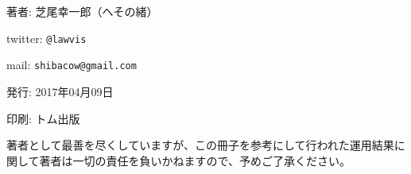 \documentclass[a5j,openany,twoside]{jsbook}
\begin{document}
\newpage

\begin{flushright}
\begin{minipage}{0.7\hsize}
\begin{description}[labelindent=1em ,labelwidth=0cm, labelsep*=1em, leftmargin =!, style = standard]%
  \item{著者:} 芝尾幸一郎（へその緒）
  \item{twitter:} \verb|@lawvis|
  \item{mail:} \verb|shibacow@gmail.com|
  \item{発行:} 2017年04月09日
  \item{印刷:} トム出版 
\end{description}
著者として最善を尽くしていますが、この冊子を参考にして行われた運用結果に関して著者は一切の責任を負いかねますので、予めご了承ください。
\end{minipage}
\end{flushright}


%
%
%
%
\end{document}
